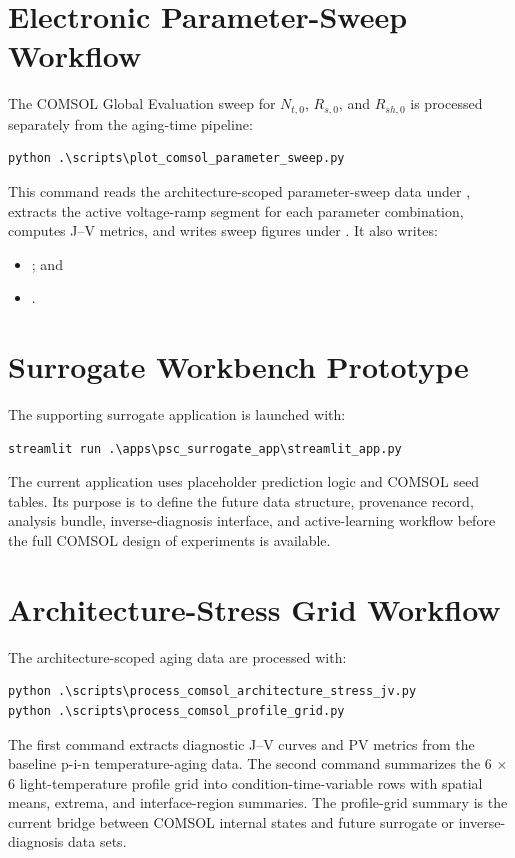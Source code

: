 \section{Electronic Parameter-Sweep Workflow}

The COMSOL Global Evaluation sweep for $N_{t,0}$, $R_{s,0}$, and $R_{sh,0}$
is processed separately from the aging-time pipeline:
\begin{verbatim}
python .\scripts\plot_comsol_parameter_sweep.py
\end{verbatim}
This command reads the architecture-scoped parameter-sweep data under
, extracts the active
voltage-ramp segment for each parameter combination, computes J--V metrics, and
writes sweep figures under
. It also writes:
\begin{itemize}
\item {}; and
\item {}.
\end{itemize}

\section{Surrogate Workbench Prototype}

The supporting surrogate application is launched with:
\begin{verbatim}
streamlit run .\apps\psc_surrogate_app\streamlit_app.py
\end{verbatim}
The current application uses placeholder prediction logic and COMSOL seed
tables. Its purpose is to define the future data structure, provenance record,
analysis bundle, inverse-diagnosis interface, and active-learning workflow
before the full COMSOL design of experiments is available.

\section{Architecture-Stress Grid Workflow}

The architecture-scoped aging data are processed with:
\begin{verbatim}
python .\scripts\process_comsol_architecture_stress_jv.py
python .\scripts\process_comsol_profile_grid.py
\end{verbatim}
The first command extracts diagnostic J--V curves and PV metrics from the
baseline p-i-n temperature-aging data. The second command summarizes the
6 $\times$ 6 light-temperature profile grid into condition-time-variable rows
with spatial means, extrema, and interface-region summaries. The profile-grid
summary is the current bridge between COMSOL internal states and future
surrogate or inverse-diagnosis data sets.
